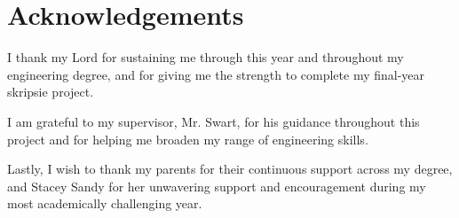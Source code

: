 \chapter*{Acknowledgements}

I thank my Lord for sustaining me through this year and throughout my engineering degree, and for giving me the strength to complete my final-year skripsie project.
\vspace{0.5cm}

\noindent I am grateful to my supervisor, Mr. Swart, for his guidance throughout this project and for helping me broaden my range of engineering skills.
\vspace{0.5cm}

\noindent Lastly, I wish to thank my parents for their continuous support across my degree, and Stacey Sandy for her unwavering support and encouragement during my most academically challenging year.
